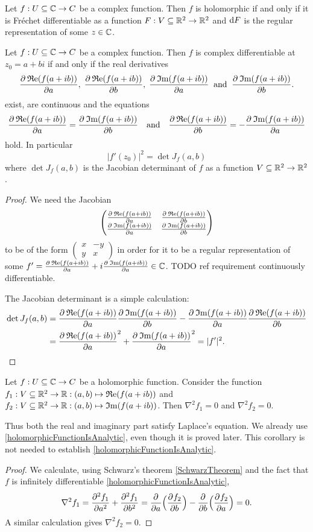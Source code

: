 \begin{lemma}
Let $f: U\subseteq \C \to C$ be a complex function. Then $f$ is holomorphic \textup{if and only if} it is Fréchet differentiable as a function $F: V\subseteq \R^2 \to \R^2$ and $\diff F$ is the regular representation of some $z\in \C$.
\end{lemma}
\begin{corollary}
Let $f: U\subseteq \C \to C$ be a complex function. Then $f$ is complex differentiable at $z_0 = a+bi$ \textup{if and only if} the real derivatives
\[ \pd{\Re(f(a + ib))}{a},\; \pd{\Re(f(a + ib))}{b},\;
\pd{\Im(f(a + ib))}{a} \;\;\text{and}\;\; \pd{\Im(f(a + ib))}{b}. \]
exist, are continuous and the equations
\[
\pd{\Re(f(a + ib))}{a} = \pd{\Im(f(a + ib))}{b} \quad\text{and}\quad \pd{\Re(f(a + ib))}{b} = -\pd{\Im(f(a + ib))}{a} \]
hold. In particular
\[ |f'(z_0)|^2 = \det J_f(a,b) \]
where $\det J_f(a,b)$ is the Jacobian determinant of $f$ as a function $V\subseteq \R^2 \to \R^2$.
\end{corollary}
\begin{proof}
We need the Jacobian
\[ \begin{pmatrix}
\pd{\Re(f(a + ib))}{a} & \pd{\Re(f(a + ib))}{b} \\
\pd{\Im(f(a + ib))}{a} & \pd{\Im(f(a + ib))}{b}
\end{pmatrix} \]
to be of the form $\begin{pmatrix}
x & -y \\ y & x
\end{pmatrix}$ in order for it to be a regular representation of some $f' =\pd{\Re(f(a + ib))}{a} + i\pd{\Im(f(a + ib))}{a} \in \C$. TODO ref requirement continuously differentiable.

The Jacobian determinant is a simple calculation:
\begin{align*}
\det J_f(a,b) &= \pd{\Re(f(a + ib))}{a}\pd{\Im(f(a + ib))}{b} - \pd{\Im(f(a + ib))}{a}\pd{\Re(f(a + ib))}{b} \\
&= \pd{\Re(f(a + ib))}{a}^2 + \pd{\Im(f(a + ib))}{a}^2 = |f'|^2.
\end{align*}
\end{proof}
\begin{corollary}
Let $f: U\subseteq \C \to C$ be a holomorphic function. Consider the function $f_1: V\subseteq \R^2 \to \R: (a,b) \mapsto \Re(f(a+ib))$ and $f_2: V\subseteq \R^2 \to \R: (a,b) \mapsto \Im(f(a+ib))$. Then $\nabla^2 f_1 = 0$ and $\nabla^2 f_2 = 0$.
\end{corollary}
Thus both the real and imaginary part satisfy Laplace's equation. We already use \ref{holomorphicFunctionIsAnalytic}, even though it is proved later. This corollary is not needed to establish \ref{holomorphicFunctionIsAnalytic}.
\begin{proof}
We calculate, using Schwarz's theorem \ref{SchwarzTheorem} and the fact that $f$ is infinitely differentiable \ref{holomorphicFunctionIsAnalytic},
\[ \nabla^2 f_1 = \pd[2]{f_1}{a} + \pd[2]{f_1}{b} = \pd{}{a}\Big(\pd{f_2}{b}\Big) - \pd{}{b}\Big(\pd{f_2}{a}\Big) = 0. \]
A similar calculation gives $\nabla^2 f_2 = 0$.
\end{proof}

